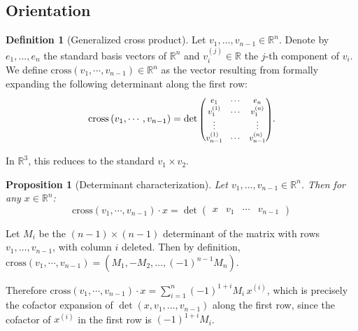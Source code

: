 \documentclass[12pt]{article}
\makeatletter
\newtheorem{proposition}[theorem]{Proposition}
\theoremstyle{definition}
\newtheorem{definition}[theorem]{Definition}
\theoremstyle{remark}
\renewenvironment{proof}[1][\proofname]{\par
  \pushQED{\qed}%
  \normalfont \footnotesize \topsep6\p@\@plus6\p@\relax
  \list{}{\leftmargin=2em
          \settowidth{\itemindent}{\itshape#1}%
          \labelwidth=\itemindent
          \parsep=0pt \listparindent=\parindent 
  }
  \item[\hskip\labelsep
        \itshape
    #1\@addpunct{.}]\ignorespaces
}{%
  \popQED\endlist\@endpefalse
}
\makeatother
\begin{document}
\subsection{Orientation}
\begin{definition}[Generalized cross product]
    Let $v_1, \ldots, v_{n-1} \in \mathbb{R}^n$. Denote by $e_1, \ldots, e_n$ the standard basis vectors of $\mathbb{R}^n$ and $v_i^{(j)} \in \mathbb{R}$ the $j$-th component of $v_i$. We define $\mathrm{cross} \left( v_1, \cdots, v_{n-1} \right)\in \mathbb{R}^n$ as the vector resulting from formally expanding the following determinant along the first row:
\begin{equation*}
\mathrm{cross} \left(v_1, \cdots, v_{n-1}\right) = \det 
\scalebox{0.82}{$
\begin{pmatrix} 
e_1 & \cdots & e_n \\ 
v_1^{(1)} & \cdots & v_1^{(n)} \\ 
\vdots & & \vdots \\ 
v_{n-1}^{(1)} & \cdots & v_{n-1}^{(n)} 
\end{pmatrix}$}.
\end{equation*}
\end{definition}

In $\mathbb{R}^3$, this reduces to the standard $v_1 \times v_2$.

\begin{proposition}[Determinant characterization]\label{prop:determinant_charact}
Let $v_1, \ldots, v_{n-1} \in \mathbb{R}^n$. Then for any $x \in \mathbb{R}^n$:
\begin{equation*}
    \mathrm{cross}\left(v_1, \cdots, v_{n-1}\right) \cdot x =
\det 
    \left( \begin{array}{c|c|c|c}
            x & v_1 & \cdots & v_{n-1} 
\end{array} \right)
\end{equation*}
\end{proposition}
\begin{proof}
Let $M_i$ be the $(n-1)\times(n-1)$ determinant of the matrix with rows $v_1, \ldots, v_{n-1}$, with column $i$ deleted.
Then by definition, $\mathrm{cross}\left(v_1, \cdots, v_{n-1}\right) = \left( M_1, -M_2, \ldots, (-1)^{n-1}M_n\right)$.

\noindent
Therefore $ \mathrm{cross}\left(v_1, \cdots, v_{n-1}\right) \cdot x = \sum_{i=1}^n (-1)^{1+i} M_i \, x^{(i)} $,
which is precisely the cofactor expansion of $\det(x, v_1, \ldots, v_{n-1})$ along the first row, since the cofactor of $x^{(i)}$ in the first row is $(-1)^{1+i} M_i$. 
\end{proof}
\end{document}

